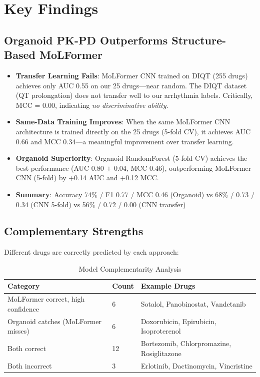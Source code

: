 \documentclass[11pt]{article}
\begin{document}
\section{Key Findings}

\subsection{Organoid PK-PD Outperforms Structure-Based MoLFormer}

\begin{itemize}
    \item \textbf{Transfer Learning Fails}: MoLFormer CNN trained on DIQT (255 drugs) achieves only AUC 0.55 on our 25 drugs---near random. The DIQT dataset (QT prolongation) does not transfer well to our arrhythmia labels. Critically, MCC = 0.00, indicating \textit{no discriminative ability}.
    \item \textbf{Same-Data Training Improves}: When the same MoLFormer CNN architecture is trained directly on the 25 drugs (5-fold CV), it achieves AUC 0.66 and MCC 0.34---a meaningful improvement over transfer learning.
    \item \textbf{Organoid Superiority}: Organoid RandomForest (5-fold CV) achieves the best performance (AUC 0.80 $\pm$ 0.04, MCC 0.46), outperforming MoLFormer CNN (5-fold) by +0.14 AUC and +0.12 MCC.
    \item \textbf{Summary}: Accuracy 74\% / F1 0.77 / MCC 0.46 (Organoid) vs 68\% / 0.73 / 0.34 (CNN 5-fold) vs 56\% / 0.72 / 0.00 (CNN transfer)
\end{itemize}

\subsection{Complementary Strengths}

Different drugs are correctly predicted by each approach:

\begin{table}[H]
\centering
\caption{Model Complementarity Analysis}
\begin{tabular}{lll}
\toprule
\textbf{Category} & \textbf{Count} & \textbf{Example Drugs} \\
\midrule
MoLFormer correct, high confidence & 6 & Sotalol, Panobinostat, Vandetanib \\
Organoid catches (MoLFormer misses) & 6 & Doxorubicin, Epirubicin, Isoproterenol \\
Both correct & 12 & Bortezomib, Chlorpromazine, Rosiglitazone \\
Both incorrect & 3 & Erlotinib, Dactinomycin, Vincristine \\
\bottomrule
\end{tabular}
\end{table}
\end{document}
